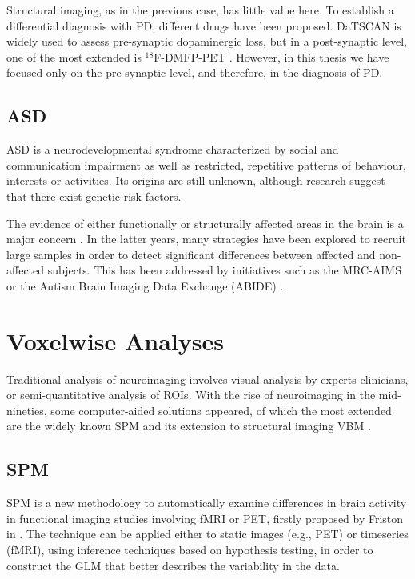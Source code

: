 Structural imaging, as in the previous case, has little value here. To establish a differential diagnosis with \ac{PD}, different drugs have been proposed. DaTSCAN is widely used to assess pre-synaptic dopaminergic loss, but in a post-synaptic level, one of the most extended is $^{18}$F-DMFP-PET \cite{Segovia2016a}. However, in this thesis we have focused only on the pre-synaptic level, and therefore, in the diagnosis of \ac{PD}. 

\subsection{\acf{ASD}}
\acf{ASD} is a neurodevelopmental syndrome characterized by social and communication impairment as well as restricted, repetitive patterns of behaviour, interests or activities. Its origins are still unknown, although research suggest \cite{Szatmari1999} that there exist genetic risk factors. 

The evidence of either functionally or structurally affected areas in the brain is a major concern \cite{Ecker2014,haar2014anatomical}. In the latter years, many strategies have been explored to recruit large samples in order to detect significant differences between affected and non-affected subjects. This has been addressed by initiatives such as the \ac{MRC-AIMS} \cite{Ecker2012,Ecker2013} or the Autism Brain Imaging Data Exchange (ABIDE) \cite{DiMartino2014}. 


\section{Voxelwise Analyses}\label{sec:vwanalyses}
Traditional analysis of neuroimaging involves visual analysis by experts clinicians, or semi-quantitative analysis of \acp{ROI}. With the rise of neuroimaging in the mid-nineties, some computer-aided solutions appeared, of which the most extended are the widely known \acf{SPM} \cite{Friston1994} and its extension to structural imaging \acf{VBM} \cite{Ashburner2000}. 

\subsection{\acf{SPM}}
\acf{SPM} is a new methodology to automatically examine differences in brain activity in functional imaging studies involving \ac{fMRI} or \ac{PET}, firstly proposed by Friston in \cite{Friston1994}. The technique can be applied either to static images (e.g., \ac{PET}) or timeseries (\ac{fMRI}), using inference techniques based on hypothesis testing, in order to construct the \ac{GLM} that better describes the variability in the data. 

